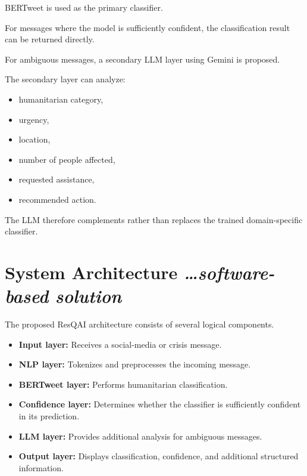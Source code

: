 \documentclass[11pt,a4paper]{article}
\newcommand{\BvrHint}[1]{%
  {\normalfont\normalsize\itshape\hfill #1}}
\begin{document}
BERTweet is used as the primary classifier.

For messages where the model is sufficiently confident, the classification
result can be returned directly.

For ambiguous messages, a secondary LLM layer using Gemini is proposed.

The secondary layer can analyze:

\begin{itemize}[leftmargin=0.7cm]

    \item humanitarian category,
    \item urgency,
    \item location,
    \item number of people affected,
    \item requested assistance,
    \item recommended action.

\end{itemize}

The LLM therefore complements rather than replaces the trained
domain-specific classifier.


\section{System Architecture %
\BvrHint{\ldots software-based solution}}

The proposed ResQAI architecture consists of several logical components.

\begin{itemize}[leftmargin=0.7cm]

    \item \textbf{Input layer:} Receives a social-media or crisis message.

    \item \textbf{NLP layer:} Tokenizes and preprocesses the incoming
    message.

    \item \textbf{BERTweet layer:} Performs humanitarian classification.

    \item \textbf{Confidence layer:} Determines whether the classifier is
    sufficiently confident in its prediction.

    \item \textbf{LLM layer:} Provides additional analysis for ambiguous
    messages.

    \item \textbf{Output layer:} Displays classification, confidence, and
    additional structured information.

\end{itemize}
\end{document}
